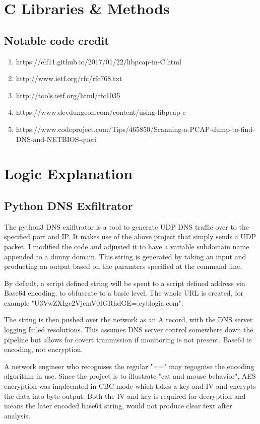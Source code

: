 \section{C Libraries & Methods}
\subsection{Notable code credit}
\begin{enumerate}
    \item https://elf11.github.io/2017/01/22/libpcap-in-C.html
    \item http://www.ietf.org/rfc/rfc768.txt
    \item http://tools.ietf.org/html/rfc1035
    \item https://www.devdungeon.com/content/using-libpcap-c
    \item https://www.codeproject.com/Tips/465850/Scanning-a-PCAP-dump-to-find-DNS-and-NETBIOS-queri
\end{enumerate}

\section{Logic Explanation}
\subsection{Python DNS Exfiltrator}
The python3 DNS exifltrator is a tool to generate UDP DNS traffic over to the specified port and IP. It makes use of the above project that simply sends a UDP packet. I modified the code and adjusted it to have a variable subdomain name appended to a dunny domain.
This string is generated by taking an input and producting an output based on the paramters specified at the command line. 

By default, a script defined string will be spent to a script defined address via Base64 encoding, to obfuscate to a basic level. The whole URL is created,
for example "U3VwZXIgc2VjcmV0IGRhdGE=.cyblogia.com". 

The string is then pushed over the network as an A record, with the DNS server logging failed resolutions. This assumes DNS server control somewhere down the pipeline but allows for covert tranmission if monitoring is not present.
Base64 is encoding, not encryption. 

A network engineer who recognises the regular "==" may regognise the encoding algorithm in use. Since the project is to illustrate "cat and mouse behavior", AES encryption was impleemted in CBC mode which takes a key and IV and encrypts the data into byte output.
Both the IV and key is required for decryption and means the later encoded base64 string, would not produce clear text after analysis. 

